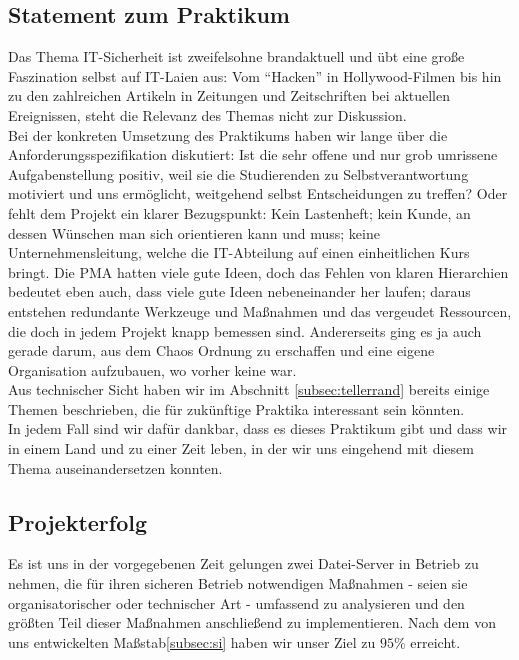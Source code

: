 \subsection{Statement zum Praktikum}
Das Thema IT-Sicherheit ist zweifelsohne brandaktuell und übt eine große Faszination selbst auf IT-Laien aus: Vom "`Hacken"' in Hollywood-Filmen bis hin zu den zahlreichen Artikeln in Zeitungen und Zeitschriften bei aktuellen Ereignissen, steht die Relevanz des Themas nicht zur Diskussion.\\

Bei der konkreten Umsetzung des Praktikums haben wir lange über die Anforderungsspezifikation diskutiert: Ist die sehr offene und nur grob umrissene Aufgabenstellung positiv, weil sie die Studierenden zu Selbstverantwortung motiviert und uns ermöglicht, weitgehend selbst Entscheidungen zu treffen? Oder fehlt dem Projekt ein klarer Bezugspunkt: Kein Lastenheft; kein Kunde, an dessen Wünschen man sich orientieren kann und muss; keine Unternehmensleitung, welche die IT-Abteilung auf einen einheitlichen Kurs bringt. Die PMA hatten viele gute Ideen, doch das Fehlen von klaren Hierarchien bedeutet eben auch, dass viele gute Ideen nebeneinander her laufen; daraus entstehen redundante Werkzeuge und Maßnahmen und das vergeudet Ressourcen, die doch in jedem Projekt knapp bemessen sind. Andererseits ging es ja auch gerade darum, aus dem Chaos Ordnung zu erschaffen und eine eigene Organisation aufzubauen, wo vorher keine war.\\

Aus technischer Sicht haben wir im Abschnitt \ref{subsec:tellerrand} bereits einige Themen beschrieben, die für zukünftige Praktika interessant sein könnten. \\

In jedem Fall sind wir dafür dankbar, dass es dieses Praktikum gibt und dass wir in einem Land und zu einer Zeit leben, in der wir uns eingehend mit diesem Thema auseinandersetzen konnten.

\subsection{Projekterfolg}
Es ist uns in der vorgegebenen Zeit gelungen zwei Datei-Server in Betrieb zu nehmen, die für ihren sicheren Betrieb notwendigen Maßnahmen - seien sie organisatorischer oder technischer Art - umfassend zu analysieren und den größten Teil dieser Maßnahmen anschließend zu implementieren. Nach dem von uns entwickelten Maßstab\ref{subsec:si} haben wir unser Ziel zu $95\%$ erreicht. \\

